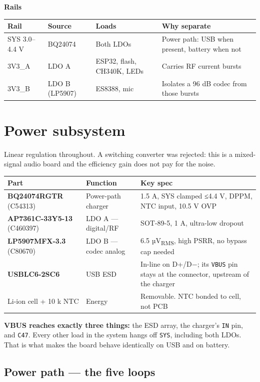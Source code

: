\documentclass[11pt]{article}
\begin{document}
\textbf{Rails}

\begin{tabularx}{\linewidth}{@{}l l X X@{}}
\toprule
\textbf{Rail} & \textbf{Source} & \textbf{Loads} & \textbf{Why separate} \\
\midrule
SYS 3.0–4.4 V & BQ24074 & Both LDOs & Power path: USB when present, battery when not \\
3V3_A & LDO A & ESP32, flash, CH340K, LEDs & Carries RF current bursts \\
3V3_B & LDO B (LP5907) & ES8388, mic & Isolates a 96 dB codec from those bursts \\
\bottomrule
\end{tabularx}

\section{Power subsystem}

Linear regulation throughout. A switching converter was rejected: this is a mixed-signal audio
board and the efficiency gain does not pay for the noise.

\begin{tabularx}{\linewidth}{@{}l l X@{}}
\toprule
\textbf{Part} & \textbf{Function} & \textbf{Key spec} \\
\midrule
\textbf{BQ24074RGTR} (C54313) & Power-path charger & 1.5 A, SYS clamped ≤4.4 V, DPPM, NTC input, 10.5 V OVP \\
\textbf{AP7361C-33Y5-13} (C460397) & LDO A — digital/RF & SOT-89-5, 1 A, ultra-low dropout \\
\textbf{LP5907MFX-3.3} (C80670) & LDO B — codec analog & 6.5 µV\textsubscript{RMS}, high PSRR, no bypass cap needed \\
\textbf{USBLC6-2SC6} & USB ESD & In-line on D+/D−; its \texttt{VBUS} pin stays at the connector, upstream of the charger \\
Li-ion cell + 10 k NTC & Energy & Removable. NTC bonded to cell, not PCB \\
\bottomrule
\end{tabularx}

\textbf{VBUS reaches exactly three things:} the ESD array, the charger's \texttt{IN} pin, and
\texttt{C47}. Every other load in the system hangs off \texttt{SYS}, including both LDOs. That is what
makes the board behave identically on USB and on battery.

\subsection{Power path — the five loops}
\end{document}
